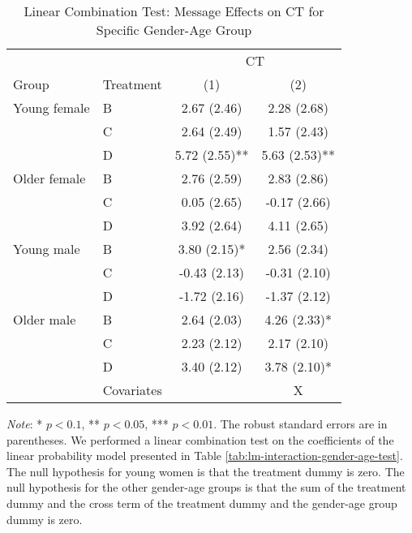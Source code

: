 \documentclass[12pt, a4paper]{article}
\begin{document}
\begin{table}[H]

\caption{\label{tab:lh-interaction-gender-age-test}Linear Combination Test: Message Effects on CT for Specific Gender-Age Group}
\centering
\fontsize{8}{10}\selectfont
\begin{threeparttable}
\begin{tabular}[t]{llcc}
\toprule
\multicolumn{2}{c}{ } & \multicolumn{2}{c}{CT} \\
\cmidrule(l{3pt}r{3pt}){3-4}
Group & Treatment & (1) & (2)\\
\midrule
Young female & B & 2.67 (2.46) & 2.28 (2.68)\\
 & C & 2.64 (2.49) & 1.57 (2.43)\\
 & D & 5.72 (2.55)** & 5.63 (2.53)**\\
Older female & B & 2.76 (2.59) & 2.83 (2.86)\\
 & C & 0.05 (2.65) & -0.17 (2.66)\\
 & D & 3.92 (2.64) & 4.11 (2.65)\\
Young male & B & 3.80 (2.15)* & 2.56 (2.34)\\
 & C & -0.43 (2.13) & -0.31 (2.10)\\
 & D & -1.72 (2.16) & -1.37 (2.12)\\
Older male & B & 2.64 (2.03) & 4.26 (2.33)*\\
 & C & 2.23 (2.12) & 2.17 (2.10)\\
 & D & 3.40 (2.12) & 3.78 (2.10)*\\
\midrule
 & Covariates &  & X\\
\bottomrule
\end{tabular}
\begin{tablenotes}
\item \emph{Note}: * $p < 0.1$, ** $p < 0.05$, *** $p < 0.01$. The robust standard errors are in parentheses. We performed a linear combination test on the coefficients of the linear probability model presented in Table \ref{tab:lm-interaction-gender-age-test}. The null hypothesis for young women is that the treatment dummy is zero. The null hypothesis for the other gender-age groups is that the sum of the treatment dummy and the cross term of the treatment dummy and the gender-age group dummy is zero.
\end{tablenotes}
\end{threeparttable}
\end{table}
\end{document}
